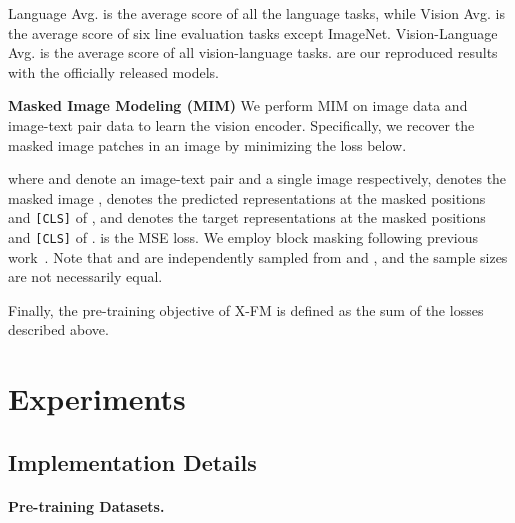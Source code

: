 \documentclass[11pt]{article}
\newcommand{\ModelName}{X-FM\xspace}
\begin{document}
\begin{table*}[t]
{Language Avg. is the average score of all the language tasks, while Vision Avg. is the average score of six line evaluation tasks except ImageNet.
Vision-Language Avg. is the average score of all vision-language tasks.
 are our reproduced results with the officially released models.}
\label{tab:main_result}
\end{table*}

{\bf Masked Image Modeling (MIM)}
We perform MIM on image data and image-text pair data to learn the vision encoder. Specifically, we recover the masked image patches in an image by minimizing the loss below.

{\setlength\abovedisplayskip{-0.2cm}
\setlength\belowdisplayskip{0.2cm}
}

where  and  denote an image-text pair and a single image respectively,  denotes the masked image ,  denotes the predicted representations at the masked positions and \texttt{[CLS]} of , and  denotes the target representations at the masked positions and \texttt{[CLS]} of . 
 is the MSE loss. We employ block masking following previous work~\citep{bao2021beit,peng2022beit}. Note that  and  are independently sampled from  and , and the sample sizes are not necessarily equal.

Finally, the pre-training objective of {\ModelName} is defined as the sum of the losses described above.
{
} \vspace{-0.3em}
\vspace{-0.3em}
\section{Experiments}



\subsection{Implementation Details}
\label{sec:impl_details}

\paragraph{Pre-training Datasets.}
\end{document}
